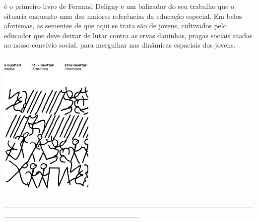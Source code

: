 {\medskip

 é o primeiro livro de Fernand Deligny e um balizador do seu trabalho que o situaria enquanto uma das maiores referências da educação especial. Em belos aforismas, as sementes de que aqui se trata são de jovens, cultivados pelo educador que deve deixar de lutar contra as ervas daninhas, pragas sociais atadas ao nosso convívio social, para mergulhar nas dinâmicas espaciais dos jovens.

\hspace{.5cm}

\hspace*{-.4cm}\begin{minipage}[c]{0.90\linewidth}
\small{
{}}
\end{minipage}

\pagebreak

\hspace{.5cm}

\begin{center}
\hspace*{-2.5cm}
\hspace{2cm}\includegraphics[width=45mm]{./imgs/guattari.png}
\end{center}

\hspace*{-2cm}\_\_\_\_\_\_\_\_\_\_\_\_\_\_\_\_\_\_\_\_\_\_\_\_\_\_\_\_\_\_\_\_\_\_\_\_\_\_\_\_\_\_\_\_\_\_\_\_\_\_\_\_\_\_\_\_\_\_\_\_\_\_\_\_\_\_\_\_\_\_\_\_\_\_

}
